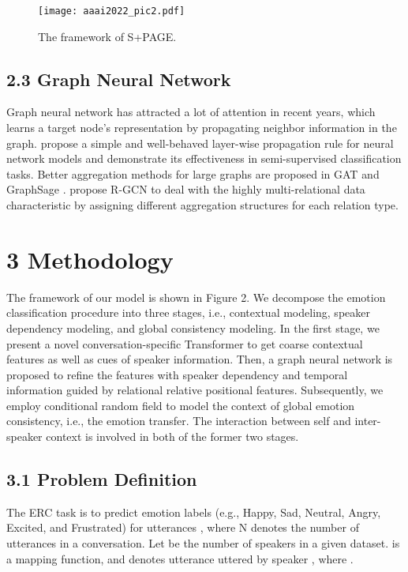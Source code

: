 \documentclass[letterpaper]{article} \usepackage{aaai22}  \usepackage{times}  \usepackage{helvet}  \usepackage{courier}  \usepackage[hyphens]{url}  \usepackage{graphicx} \urlstyle{rm} \def\UrlFont{\rm}  \usepackage{natbib}  \usepackage{caption} \DeclareCaptionStyle{ruled}{labelfont=normalfont,labelsep=colon,strut=off} \frenchspacing  \setlength{\pdfpagewidth}{8.5in}  \setlength{\pdfpageheight}{11in}  \usepackage{algorithm}
\begin{document}
\begin{figure*}[t]
\centering
\texttt{[image: aaai2022\_pic2.pdf]} \caption{The framework of S+PAGE.}
\label{fig2}
\end{figure*}

\subsection{2.3 Graph Neural Network} 
Graph neural network has attracted a lot of attention in recent years, which learns a target node’s representation by
propagating neighbor information in the graph.
\citet{kipf} propose a simple and well-behaved layer-wise propagation rule for neural network models and demonstrate its effectiveness in semi-supervised classification tasks.
Better aggregation methods for large graphs are proposed in GAT \cite{gat} and GraphSage \cite{graphsage}.
\citet{rgcn} propose R-GCN to deal with the highly multi-relational data characteristic by assigning different aggregation structures for each relation type. 


\section{3 Methodology}






The framework of our model is shown in Figure 2. We decompose the emotion classification procedure into three stages, i.e., contextual modeling, speaker dependency modeling, and global consistency modeling. In the first stage, we present a novel conversation-specific Transformer to get coarse contextual features as well as cues of speaker information. Then, a graph neural network is proposed to refine the features with speaker dependency and temporal information guided by relational relative positional features. Subsequently, we employ conditional random field to model the context of global emotion consistency, i.e., the emotion transfer. The interaction between self and inter-speaker context is involved in both of the former two stages.

\subsection{3.1 Problem Definition}
The ERC task is to predict emotion labels (e.g., Happy, Sad, Neutral, Angry, Excited, and Frustrated) for utterances , where N denotes the number of utterances in a conversation. 
Let  be the number of speakers in a given dataset.  is a mapping function, and  denotes utterance  uttered by speaker , where .
\end{document}
